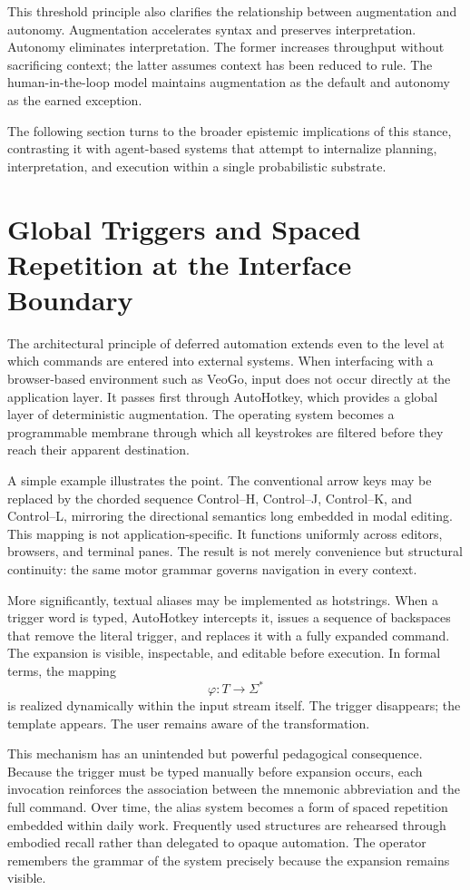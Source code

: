 \documentclass[11pt]{article}
\begin{document}
This threshold principle also clarifies the relationship between augmentation and autonomy. Augmentation accelerates syntax and preserves interpretation. Autonomy eliminates interpretation. The former increases throughput without sacrificing context; the latter assumes context has been reduced to rule. The human-in-the-loop model maintains augmentation as the default and autonomy as the earned exception.

The following section turns to the broader epistemic implications of this stance, contrasting it with agent-based systems that attempt to internalize planning, interpretation, and execution within a single probabilistic substrate.

\section{Global Triggers and Spaced Repetition at the Interface Boundary}

The architectural principle of deferred automation extends even to the level at which commands are entered into external systems. When interfacing with a browser-based environment such as VeoGo, input does not occur directly at the application layer. It passes first through AutoHotkey, which provides a global layer of deterministic augmentation. The operating system becomes a programmable membrane through which all keystrokes are filtered before they reach their apparent destination.

A simple example illustrates the point. The conventional arrow keys may be replaced by the chorded sequence Control--H, Control--J, Control--K, and Control--L, mirroring the directional semantics long embedded in modal editing. This mapping is not application-specific. It functions uniformly across editors, browsers, and terminal panes. The result is not merely convenience but structural continuity: the same motor grammar governs navigation in every context.

More significantly, textual aliases may be implemented as hotstrings. When a trigger word is typed, AutoHotkey intercepts it, issues a sequence of backspaces that remove the literal trigger, and replaces it with a fully expanded command. The expansion is visible, inspectable, and editable before execution. In formal terms, the mapping
\[
\varphi : T \to \Sigma^{*}
\]
is realized dynamically within the input stream itself. The trigger disappears; the template appears. The user remains aware of the transformation.

This mechanism has an unintended but powerful pedagogical consequence. Because the trigger must be typed manually before expansion occurs, each invocation reinforces the association between the mnemonic abbreviation and the full command. Over time, the alias system becomes a form of spaced repetition embedded within daily work. Frequently used structures are rehearsed through embodied recall rather than delegated to opaque automation. The operator remembers the grammar of the system precisely because the expansion remains visible.
\end{document}
